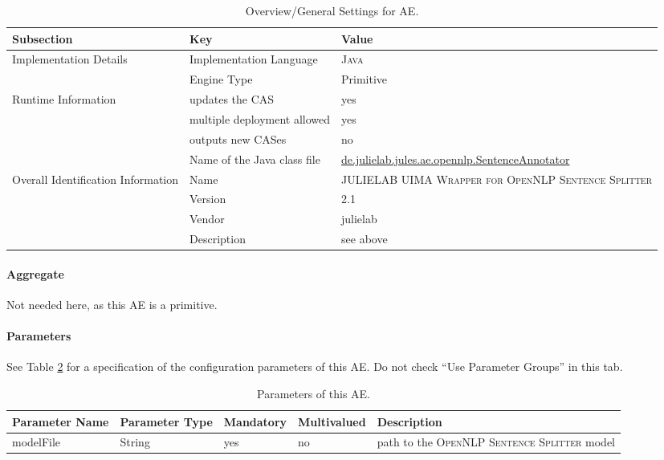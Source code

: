 \documentclass[11pt,a4paper,halfparskip]{scrartcl}
\begin{document}
\begin{table}[h!]
  \centering
  \begin{tabular}{|p{3.5cm}|p{4cm}|p{6cm}|}
    \hline
    Subsection & Key & Value \\
    \hline\hline
    Implementation Details & Implementation Language &  \textsc{Java} \\
    \cline{2-3}
    & Engine Type & Primitive\\
    \hline
    Runtime Information & updates the CAS & yes  \\
    \cline{2-3}
    & multiple deployment allowed & yes \\
    \cline{2-3}
    & outputs new CASes & no \\
    \cline{2-3}
    & Name of the Java class file & \url{de.julielab.jules.ae.opennlp.SentenceAnnotator}\\
    \hline
    Overall Identification Information & Name & \textsc{JULIELAB UIMA Wrapper for OpenNLP Sentence
 Splitter} \\
    \cline{2-3}
    & Version & 2.1 \\
    \cline{2-3}
    & Vendor & julielab\\
    \cline{2-3}
    & Description & see above\\
    \hline
  \end{tabular}
  \caption{Overview/General Settings for AE.}
  \label{tab:overview}
\end{table}


\paragraph{Aggregate}
Not needed here, as this AE is a primitive.

\paragraph{Parameters}
\label{sss:parameters}

See Table \ref{tab:parameters} for a specification of the
configuration parameters of this AE. Do not check ``Use Parameter
Groups'' in this tab.

\begin{table}[h!]
  \centering
  \begin{tabular}{|p{4cm}|p{2cm}|p{2cm}|p{2cm}|p{4cm}|}
    \hline 
    Parameter Name & Parameter Type & Mandatory & Multivalued & Description \\
   \hline \hline
      modelFile & String & yes &no &  path to the \textsc{OpenNLP Sentence Splitter}
model\\
  \hline
  \end{tabular}
  \caption{Parameters of this AE.}
  \label{tab:parameters}
\end{table}
\end{document}
